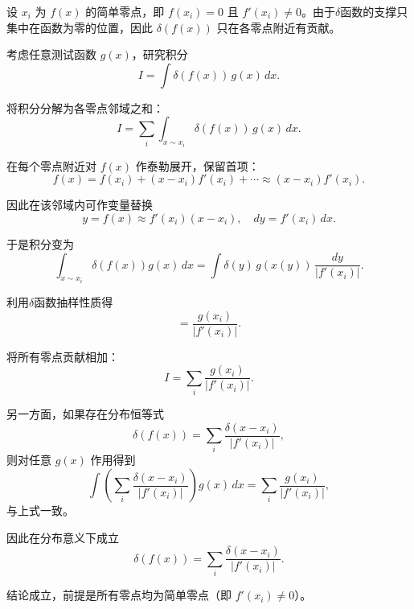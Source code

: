 \begin{solution}[δ函数复合函数]

\answer
设 $x_i$ 为 $f(x)$ 的简单零点，即 $f(x_i)=0$ 且 $f'(x_i)\neq 0$。由于$ \delta $函数的支撑只集中在函数为零的位置，因此 $\delta(f(x))$ 只在各零点附近有贡献。

考虑任意测试函数 $g(x)$，研究积分
\[
I=\int \delta(f(x))\,g(x)\,dx.
\]

将积分分解为各零点邻域之和：
\[
I=\sum_i \int_{x\sim x_i} \delta(f(x))\,g(x)\,dx.
\]

在每个零点附近对 $f(x)$ 作泰勒展开，保留首项：
\[
f(x)=f(x_i)+ (x-x_i)f'(x_i)+\cdots \approx (x-x_i)f'(x_i).
\]

因此在该邻域内可作变量替换
\[
y=f(x)\approx f'(x_i)(x-x_i), \quad dy=f'(x_i)\,dx.
\]

于是积分变为
\[
\int_{x\sim x_i} \delta(f(x))g(x)\,dx
=
\int \delta(y)\,g(x(y))\,\frac{dy}{|f'(x_i)|}.
\]

利用$ \delta $函数抽样性质得
\[
=\frac{g(x_i)}{|f'(x_i)|}.
\]

将所有零点贡献相加：
\[
I=\sum_i \frac{g(x_i)}{|f'(x_i)|}.
\]

另一方面，如果存在分布恒等式
\[
\delta(f(x))=\sum_i \frac{\delta(x-x_i)}{|f'(x_i)|},
\]
则对任意 $g(x)$ 作用得到
\[
\int \left(\sum_i \frac{\delta(x-x_i)}{|f'(x_i)|}\right) g(x)\,dx
=
\sum_i \frac{g(x_i)}{|f'(x_i)|},
\]
与上式一致。

因此在分布意义下成立
\[
\delta(f(x))=\sum_i \frac{\delta(x-x_i)}{|f'(x_i)|}.
\]

结论成立，前提是所有零点均为简单零点（即 $f'(x_i)\neq 0$）。
\end{solution}

